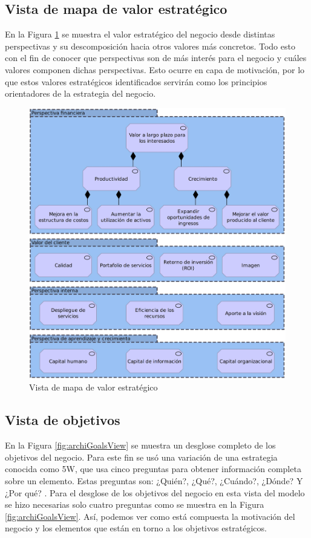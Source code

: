 \subsection{Vista de mapa de valor estratégico}
\noindent
En la Figura \ref{fig:archiSVMView} se muestra el valor estratégico del negocio desde distintas perspectivas y su descomposición hacia otros valores más concretos. Todo esto con el fin de conocer que perspectivas son de más interés para el negocio y cuáles valores componen dichas perspectivas. Esto ocurre en capa de motivación, por lo que estos valores estratégicos identificados servirán como los principios orientadores de la estrategia del negocio.

\begin{figure}[H]
	\centering
	\includegraphics[scale=0.15]{tablas-images/archi/Strategic Value Map View.jpg}
	\caption{Vista de mapa de valor estratégico}
    \label{fig:archiSVMView}
\end{figure}

\subsection{Vista de objetivos}
\noindent
En la Figura \ref{fig:archiGoalsView} se muestra un desglose completo de los objetivos del negocio. Para este fin se usó una variación de una estrategia conocida como 5W, que usa cinco preguntas para obtener información completa sobre un elemento. Estas preguntas son: ¿Quién?, ¿Qué?, ¿Cuándo?, ¿Dónde? Y ¿Por qué? \citep{5WAmitava}. Para el desglose de los objetivos del negocio en esta vista del modelo se hizo necesarias solo cuatro preguntas como se muestra en la Figura \ref{fig:archiGoalsView}. Así, podemos ver como está compuesta la motivación del negocio y los elementos que están en torno a los objetivos estratégicos.

